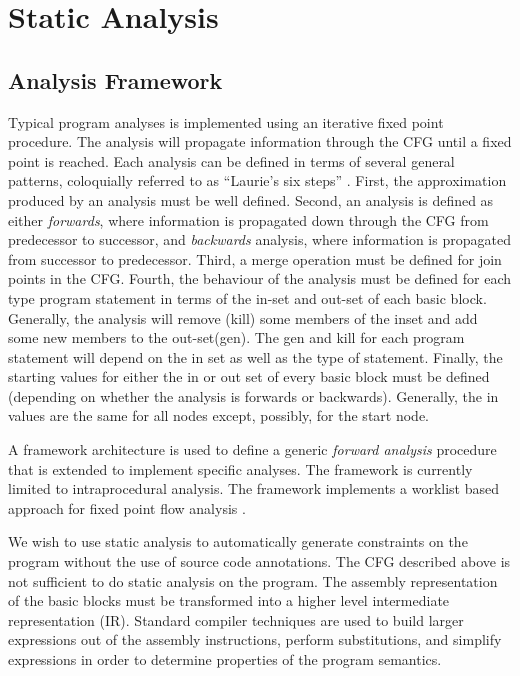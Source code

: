 \section{Static Analysis}

\subsection{Analysis Framework}

	Typical program analyses is implemented using an iterative fixed point procedure. 
	The analysis will propagate information through the CFG until a fixed point is reached. Each analysis can be defined in terms of several general patterns, coloquially referred to as ``Laurie's six steps'' \cite{lauriesteps}. 
	First, the approximation produced by an analysis must be well defined. 
	Second, an analysis is defined as either \emph{forwards}, where information is propagated down through the CFG from predecessor to successor, and \emph{backwards} analysis, where information is propagated from successor to predecessor. 
	Third, a merge operation must be defined for join points in the CFG. 
	Fourth, the behaviour of the analysis must be defined for each type program statement in terms of the in-set and out-set of each basic block. Generally, the analysis will remove (kill) some members of the inset and add some new members to the out-set(gen). The gen and kill for each program statement will depend on the in set as well as the type of statement. 
	Finally, the starting values for either the in or out set of every basic block must be defined (depending on whether the analysis is forwards or backwards). Generally, the in values are the same for all nodes except, possibly, for the start node.

	A framework architecture is used to define a generic \emph{forward analysis} procedure that is extended to implement specific analyses. The framework is currently limited to intraprocedural analysis. The framework implements a worklist based approach for fixed point flow analysis \cite{andrew2002modern}.

	We wish to use static analysis to automatically generate constraints on the program without the use of source code annotations.
	The CFG described above is not sufficient to do static analysis on the program. 
	The assembly representation of the basic blocks must be transformed into a higher level intermediate representation (IR). 
	Standard compiler techniques \cite{andrew2002modern} are used to build larger expressions out of the assembly instructions, perform substitutions, and simplify expressions in order to determine properties of the program semantics. 

